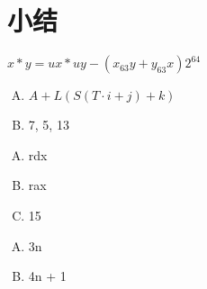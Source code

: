 
\section{小结}
{
    \begin{practicec}

    \end{practicec}

    \begin{practicec}
        $x * y = ux * uy - (x_{63}y + y_{63}x)2^{64}$
    \end{practicec}

    \begin{practicec}

    \end{practicec}

    \begin{practicec}

    \end{practicec}

    \begin{practicec}

    \end{practicec}

    \begin{practicec}

    \end{practicec}

    \begin{practicec}
        \begin{enumerate}[A.]
            \item $A + L(S(T \cdot i + j) + k)$
            \item 7, 5, 13
        \end{enumerate}
    \end{practicec}

    \begin{practicec}
        \begin{enumerate}[A.]
            \item rdx
            \item rax
            \item 15
        \end{enumerate}
    \end{practicec}

    \begin{practicec}
        \begin{enumerate}[A.]
            \item 3n
            \item 4n + 1
        \end{enumerate}
    \end{practicec}

}
